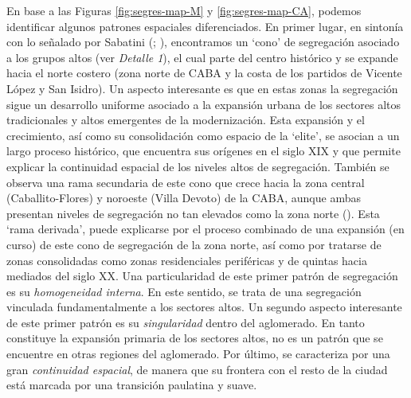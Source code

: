 \documentclass[
  spanish,
  a4paper,%
  chapterprefix=true,%
  DIV=calc,%
  twoside]{scrbook}%
\begin{document}
En base a las Figuras \ref{fig:segres-map-M} y
\ref{fig:segres-map-CA}, podemos identificar algunos patrones
espaciales diferenciados. En primer lugar, en sintonía con lo señalado
por Sabatini (; ), encontramos un `cono' de
segregación asociado a los grupos altos (ver \emph{Detalle 1}), el cual parte
del centro histórico y se expande hacia el norte costero (zona norte de
CABA y la costa de los partidos de Vicente López y San Isidro). Un
aspecto interesante es que en estas zonas la segregación sigue un
desarrollo uniforme asociado a la expansión urbana de los sectores altos
tradicionales y altos emergentes de la modernización. Esta expansión y
el crecimiento, así como su consolidación como espacio de la `elite', se
asocian a un largo proceso histórico, que encuentra sus orígenes en el
siglo XIX y que permite explicar la continuidad espacial de los niveles
altos de segregación. También se observa una rama secundaria de este
cono que crece hacia la zona central (Caballito-Flores) y noroeste
(Villa Devoto) de la CABA, aunque ambas presentan niveles de segregación
no tan elevados como la zona norte (). Esta `rama derivada',
puede explicarse por el proceso combinado de una expansión (en curso) de
este cono de segregación de la zona norte, así como por tratarse de
zonas consolidadas como zonas residenciales periféricas y de quintas
hacia mediados del siglo XX. Una particularidad de este primer patrón de
segregación es su \emph{homogeneidad interna}. En este sentido, se trata de
una segregación vinculada fundamentalmente a los sectores altos. Un
segundo aspecto interesante de este primer patrón es su \emph{singularidad}
dentro del aglomerado. En tanto constituye la expansión primaria de los
sectores altos, no es un patrón que se encuentre en otras regiones del
aglomerado. Por último, se caracteriza por una gran \emph{continuidad
espacial}, de manera que su frontera con el resto de la ciudad está
marcada por una transición paulatina y suave.
\end{document}
